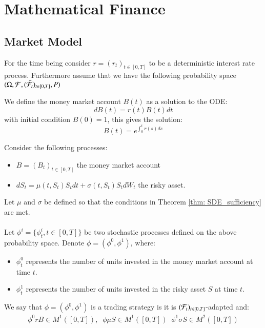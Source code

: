\chapter{Mathematical Finance}

\section{Market Model}
For the time being consider $r = (r_{t})_{t\in [0,T]}$ to be a deterministic interest rate process. Furthermore assume that we have the following probability space $(\Omega, \mathcal{F}, (\bar{\mathcal{F}}_{t})_{t\in [0,T]}, P)$

\begin{definition}
We define the money market account $B(t)$ as a solution to the ODE: 
$$
dB(t) = r(t)B(t)dt
$$
with initial condition $B(0) = 1$, this gives the solution:
$$
B(t) = e^{\int_{0}^{t}r(s)ds}
$$
\end{definition}

Consider the following processes:
\begin{itemize}
    \item $B = (B_{t})_{t\in [0,T]}$ the money market account
    \item $
    dS_{t} = \mu(t,S_{t})S_{t}dt + \sigma(t,S_{t})S_{t}dW_{t}$ the risky asset. 
    
\end{itemize}

Let $\mu$ and $\sigma$ be defined so that the conditions in Theorem \ref{thm: SDE_sufficiency} are met. 
\\~\\ 
Let $\phi^{i} = \{\phi_{t}^{i}, t \in [0,T]\}$ be two stochastic processes defined on the above probability space. Denote $\phi = (\phi^{0}, \phi^{1})$, where:
\begin{itemize}
    \item $\phi_{t}^{0}$ represents the number of units invested in the money market account at time $t$.
    \item $\phi_{t}^{1}$ represents the number of units invested in the risky asset $S$ at time $t$. 
\end{itemize}

\begin{definition}
We say that $\phi = (\phi^{0}, \phi^{1})$ is a trading strategy is it is $(\mathcal{F}_{t})_{t\in [0,T]}$-adapted and: 
\begin{align*}
\phi^{0}rB \in M^{1}([0,T]), \;\; \phi \mu S \in M^{1}([0,T])\;\; \phi^{1}\sigma S \in M^{2}([0,T])    
\end{align*}
\end{definition}

